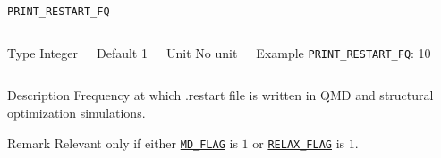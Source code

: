 \begin{frame}[allowframebreaks]{\texttt{PRINT\_RESTART\_FQ}} \label{PRINT_RESTART_FQ}
\vspace*{-12pt}
\begin{columns}
\begin{block}{Type}
Integer
\end{block}

\begin{block}{Default}
1
\end{block}

\begin{block}{Unit}
No unit
\end{block}

\begin{block}{Example}
\texttt{PRINT\_RESTART\_FQ}: 10
\end{block}
\end{columns}

\begin{block}{Description}
Frequency at which .restart file is written in QMD and structural optimization simulations.
\end{block}

\begin{block}{Remark}
Relevant only if either \hyperlink{MD_FLAG}{\texttt{MD\_FLAG}} is $1$ or \hyperlink{RELAX_FLAG}{\texttt{RELAX\_FLAG}} is $1$.
\end{block}

\end{frame}




